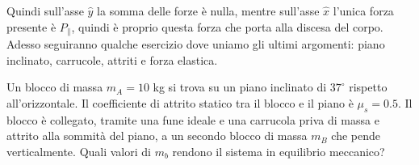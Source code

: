 \documentclass{rapport}
\begin{document}
\begin{center}
\end{center}
Quindi sull'asse $\hat{y}$ la somma delle forze è nulla, mentre sull'asse $\hat{x}$ l'unica forza presente è $P_\parallel$, quindi è proprio questa forza che porta alla discesa del corpo. Adesso seguiranno qualche esercizio dove uniamo gli ultimi argomenti: piano inclinato, carrucole, attriti e forza elastica.

\begin{esercizio}{}{}
  Un blocco di massa $m_A = 10$ kg si trova su un piano inclinato di $37^\circ$ rispetto all'orizzontale. Il coefficiente di attrito statico tra il blocco e il piano è $\mu_s = 0.5$. Il blocco è collegato, tramite una fune ideale e una carrucola priva di massa e attrito alla sommità del piano, a un secondo blocco di massa $m_B$ che pende verticalmente. Quali valori di $m_b$ rendono il sistema in equilibrio meccanico?
\end{esercizio}
\end{document}
